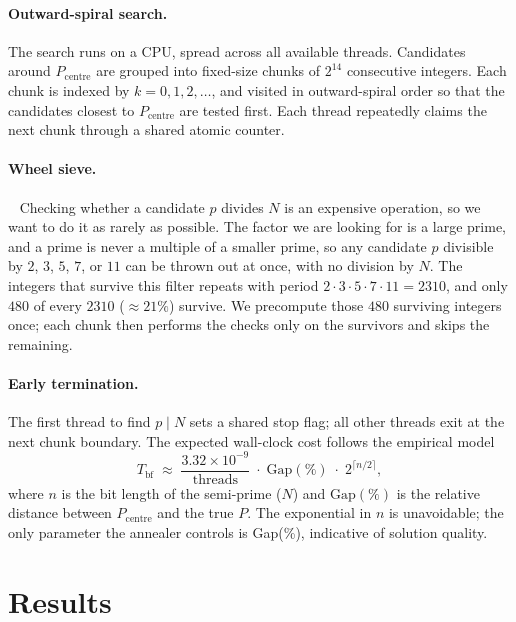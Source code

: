 \documentclass[reprint,twocolumn,amsmath,amssymb,nofootinbib]{revtex4-2}
\begin{document}
\paragraph{Outward-spiral search.} The search runs on a CPU, spread across all available threads. Candidates around $P_{\mathrm{centre}}$ are grouped into fixed-size chunks of $2^{14}$ consecutive integers. Each chunk is indexed by $k = 0, 1, 2, \dots$, and visited in outward-spiral order so that the candidates closest to $P_{\mathrm{centre}}$ are tested first. Each thread repeatedly claims the next chunk through a shared atomic counter.

\paragraph{Wheel sieve.}~\cite{Pritchard1982} Checking whether a candidate $p$ divides $N$ is an expensive operation, so we want to do it as rarely as possible. The factor we are looking for is a large prime, and a prime is never a multiple of a smaller prime, so any candidate $p$ divisible by $2$, $3$, $5$, $7$, or $11$ can be thrown out at once, with no division by $N$. The integers that survive this filter repeats with period $2 \cdot 3 \cdot 5 \cdot 7 \cdot 11 = 2310$, and only $480$ of every $2310$ ($\approx 21\%$) survive. We precompute those $480$ surviving integers once; each chunk then performs the checks only on the survivors and skips the remaining.

\paragraph{Early termination.} The first thread to find $p \mid N$ sets a shared stop flag; all other threads exit at the next chunk boundary. The expected wall-clock cost follows the empirical model
\begin{equation}
  T_{\mathrm{bf}} \;\approx\;
  \frac{3.32 \times 10^{-9}}{\mathrm{threads}} \;\cdot\;
  \mathrm{Gap}(\%) \;\cdot\; 2^{\lceil n/2 \rceil},
  \label{eq:bf-time}
\end{equation}
where $n$ is the bit length of the semi-prime ($N$) and $\mathrm{Gap}(\%)$ is the relative distance between $P_{\mathrm{centre}}$ and the true $P$. The exponential in $n$ is unavoidable; the only parameter the annealer controls is Gap(\%), indicative of solution quality.

\section{Results}\label{sec:results}
\end{document}
